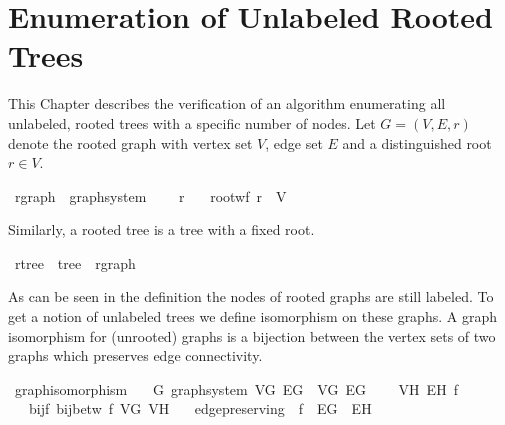 \chapter{Enumeration of Unlabeled Rooted Trees}\label{chapter:rootred_tree_enum}

This Chapter describes the verification of an algorithm enumerating all unlabeled, rooted trees with a specific number of nodes.
Let $G = (V,E,r)$ denote the rooted graph with vertex set $V$, edge set $E$ and a distinguished root $r \in V$.

\begin{isabellebox}
\isamarkupfalse%
\ rgraph\ {\isacharequal}{\kern0pt}\ graph{\isacharunderscore}{\kern0pt}system\ {\isacharplus}{\kern0pt}\isanewline
\ \ \ r\isanewline
\ \ \ root{\isacharunderscore}{\kern0pt}wf{\isacharcolon}{\kern0pt}\ {\isachardoublequoteopen}r\ {\isasymin}\ V{\isachardoublequoteclose}
\end{isabellebox}

Similarly, a rooted tree is a tree with a fixed root.

\begin{isabellebox}
    \isamarkupfalse%
    \ rtree\ {\isacharequal}{\kern0pt}\ tree\ {\isacharplus}{\kern0pt}\ rgraph
\end{isabellebox}

As can be seen in the definition the nodes of rooted graphs are still labeled.
To get a notion of unlabeled trees we define isomorphism on these graphs.
A graph isomorphism for (unrooted) graphs is a bijection between the vertex sets of two graphs which preserves edge connectivity.

\begin{isabellebox}
\isamarkupfalse%
\ graph{\isacharunderscore}{\kern0pt}isomorphism\ {\isacharequal}{\kern0pt}\isanewline
\ \ G{\isacharcolon}{\kern0pt}\ graph{\isacharunderscore}{\kern0pt}system\ V\isactrlsub G\ E\isactrlsub G\ \ V\isactrlsub G\ E\isactrlsub G\ {\isacharplus}{\kern0pt}\isanewline
\ \ \ V\isactrlsub H\ E\isactrlsub H\ f\isanewline
\ \ \ bij{\isacharunderscore}{\kern0pt}f{\isacharcolon}{\kern0pt}\ {\isachardoublequoteopen}bij{\isacharunderscore}{\kern0pt}betw\ f\ V\isactrlsub G\ V\isactrlsub H{\isachardoublequoteclose}\isanewline
\ \ \ edge{\isacharunderscore}{\kern0pt}preserving{\isacharcolon}{\kern0pt}\ {\isachardoublequoteopen}{\isacharparenleft}{\kern0pt}{\isacharparenleft}{\kern0pt}{\isacharbackquote}{\kern0pt}{\isacharparenright}{\kern0pt}\ f{\isacharparenright}{\kern0pt}\ {\isacharbackquote}{\kern0pt}\ E\isactrlsub G\ {\isacharequal}{\kern0pt}\ E\isactrlsub H{\isachardoublequoteclose}
\end{isabellebox}

